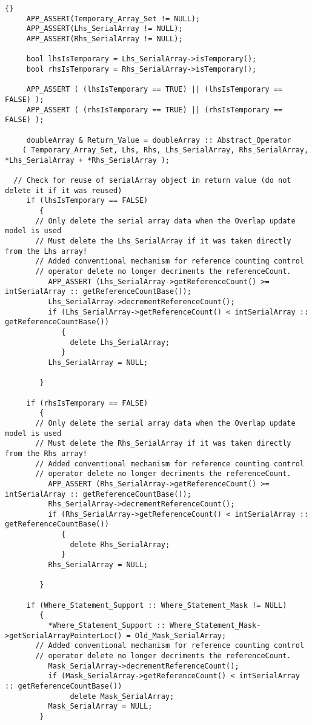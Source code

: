 \documentclass[10pt]{llncs}
\begin{document}
\begin{lstlisting}{}
     APP_ASSERT(Temporary_Array_Set != NULL);
     APP_ASSERT(Lhs_SerialArray != NULL);
     APP_ASSERT(Rhs_SerialArray != NULL);

     bool lhsIsTemporary = Lhs_SerialArray->isTemporary();
     bool rhsIsTemporary = Rhs_SerialArray->isTemporary();

     APP_ASSERT ( (lhsIsTemporary == TRUE) || (lhsIsTemporary == FALSE) );
     APP_ASSERT ( (rhsIsTemporary == TRUE) || (rhsIsTemporary == FALSE) );

     doubleArray & Return_Value = doubleArray :: Abstract_Operator 
	( Temporary_Array_Set, Lhs, Rhs, Lhs_SerialArray, Rhs_SerialArray, *Lhs_SerialArray + *Rhs_SerialArray );

  // Check for reuse of serialArray object in return value (do not delete it if it was reused)
     if (lhsIsTemporary == FALSE)
        {
       // Only delete the serial array data when the Overlap update model is used
       // Must delete the Lhs_SerialArray if it was taken directly from the Lhs array!
       // Added conventional mechanism for reference counting control
       // operator delete no longer decriments the referenceCount.
          APP_ASSERT (Lhs_SerialArray->getReferenceCount() >= intSerialArray :: getReferenceCountBase());
          Lhs_SerialArray->decrementReferenceCount();
          if (Lhs_SerialArray->getReferenceCount() < intSerialArray :: getReferenceCountBase())
             {
               delete Lhs_SerialArray;
             }
          Lhs_SerialArray = NULL;

        }

     if (rhsIsTemporary == FALSE)
        {
       // Only delete the serial array data when the Overlap update model is used
       // Must delete the Rhs_SerialArray if it was taken directly from the Rhs array!
       // Added conventional mechanism for reference counting control
       // operator delete no longer decriments the referenceCount.
          APP_ASSERT (Rhs_SerialArray->getReferenceCount() >= intSerialArray :: getReferenceCountBase());
          Rhs_SerialArray->decrementReferenceCount();
          if (Rhs_SerialArray->getReferenceCount() < intSerialArray :: getReferenceCountBase())
             {
               delete Rhs_SerialArray;
             }
          Rhs_SerialArray = NULL;

        }

     if (Where_Statement_Support :: Where_Statement_Mask != NULL)
        {
          *Where_Statement_Support :: Where_Statement_Mask->getSerialArrayPointerLoc() = Old_Mask_SerialArray; 
       // Added conventional mechanism for reference counting control
       // operator delete no longer decriments the referenceCount.
          Mask_SerialArray->decrementReferenceCount();
          if (Mask_SerialArray->getReferenceCount() < intSerialArray :: getReferenceCountBase())
               delete Mask_SerialArray;
          Mask_SerialArray = NULL;
        }


\end{lstlisting}
\end{document}
